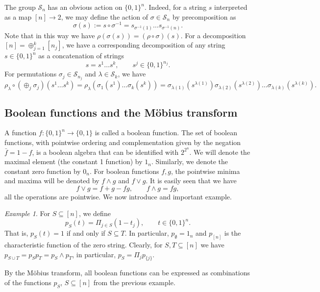 \documentclass[12pt]{article}
\theoremstyle{definition}
\theoremstyle{remark}
\newtheorem{exm}{Example}
\def\permut{\mathscr{S}}
\begin{document}
The group $\permut_n$ has an obvious action on $\{0,1\}^n$. Indeed,
 for a string $s$  interpreted as a map $[n]\to 2$, we may define the action of
$\sigma\in \permut_n$ by precomposition as
\[
\sigma(s):=s\circ\sigma^{-1}=s_{\sigma^{-1}(1)}\dots s_{\sigma^{-1}(n)}.
\]
Note that in this way we have $\rho(\sigma(s))=(\rho\circ \sigma)(s)$. For a decomposition
$[n]=\oplus_{j=1}^k[n_j]$, we have a corresponding decomposition of
any string $s\in \{0,1\}^n$ as a concatenation of strings
\[
s=s^1\dots s^k,\qquad s^j\in \{0,1\}^{n_j}.
\]
For permutations $\sigma_j\in \permut_{n_j}$ and  $\lambda\in
\permut_k$, we have
\[
\rho_\lambda\circ(\oplus_j\sigma_j)(s^1\dots s^k)=\rho_\lambda(\sigma_1(s^1)\dots
\sigma_k(s^k))=\sigma_{\lambda(1)}(s^{\lambda(1)})\sigma_{\lambda(2)}(s^{\lambda(2)})\dots
\sigma_{\lambda(k)}(s^{\lambda(k)}).
\]





\subsection{Boolean functions and the  M\"obius transform}
\label{sec:boolean}

A function $f:\{0,1\}^n\to \{0,1\}$ is called a boolean function. 
The set of boolean functions, with pointwise ordering and complementation given by the
negation $\bar f=1-f$,  is a boolean algebra that can be identified with $2^{2^n}$.
We will denote the maximal element (the constant 1 function) by $1_n$. Similarly,
we denote the constant zero function by $0_n$.  For boolean
functions $f,g$, the pointwise minima and maxima will be denoted by $f\wedge g$ and $f\vee
g$. It is easily seen that we have
\begin{equation}\label{eq:wedgevee_fun}
f\vee g= f+g-fg,\qquad f\wedge g=fg,
\end{equation}
all the operations are pointwise. We now introduce and important example. 


\begin{exm}\label{ex:pS}
For $S\subseteq [n]$, we define
\[
p_S(t)=\Pi_{j\in S}(1-t_j),\qquad t\in \{0,1\}^n.
\]
That is, $p_S(t)=1$ if and only if $S\subseteq T$. In particular,
$p_\emptyset=1_n$ and $p_{[n]}$ is the characteristic function of the zero string.
Clearly, for $S,T\subseteq [n]$ we have $p_{S\cup T}=p_Sp_T=p_S\wedge p_T$, in particular,
$p_S=\Pi_jp_{\{j\}}$. 
\end{exm}

By the M\"obius transform, all boolean functions can be expressed as combinations of the functions $p_S$, $S\subseteq
[n]$ from the previous example.
\end{document}
